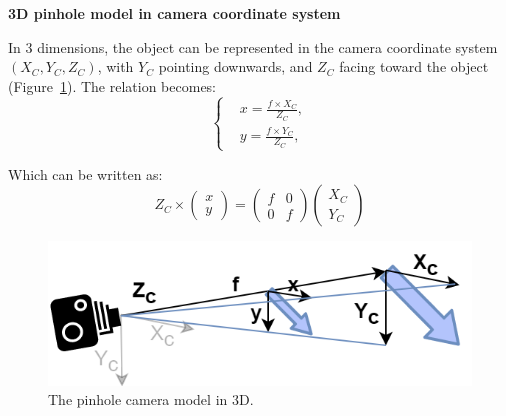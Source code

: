 \FloatBarrier
\noindent\textbf{3D pinhole model in camera coordinate system}

In 3 dimensions, the object can be represented in the camera coordinate system $(X_C, Y_C, Z_C)$, with $Y_C$ pointing downwards, and $Z_C$ facing toward the object (Figure~\ref{fig_camera3d}). The relation becomes:
\begin{equation}
  \begin{cases}
  &x=\frac{f\times X_C}{Z_C},\\
  &y=\frac{f\times Y_C}{Z_C},
  \end{cases}
\end{equation}

Which can be written as:
\begin{equation}
  Z_C \times \begin{pmatrix}x\\y\end{pmatrix} 
  = \begin{pmatrix}f & 0 \\0 & f\end{pmatrix}\begin{pmatrix}X_C\\Y_C\end{pmatrix}
\end{equation}



\begin{figure}[hbtp]
	\centering
	\def\svgwidth{\columnwidth}
	\fontsize{10pt}{10pt}\selectfont
	\includegraphics[width=0.5\linewidth]{"../Chap2/Figures/Camera_3D.png"}
	\caption{The pinhole camera model in 3D.} 
	\label{fig_camera3d}
\end{figure}


